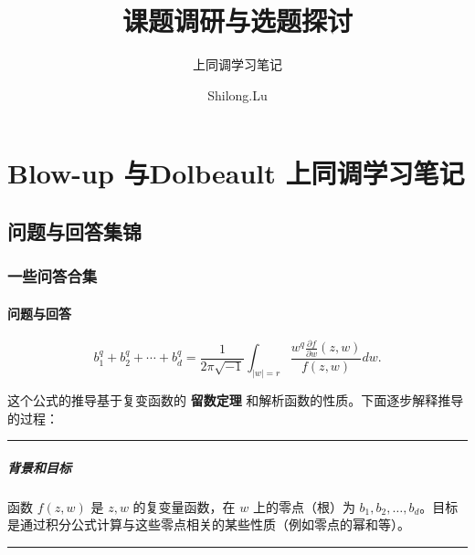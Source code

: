 \documentclass[lang=cn,zihao=-4,fontset=none,twoside]{fancybook}
\begin{document}
\thispagestyle{empty}
\title{课题调研与选题探讨}
\subtitle{上同调学习笔记}
\author{Shilong.Lu}
\makecover

\frontmatter
{}

\thispagestyle{empty}
\tableofcontents\let\cleardoublepage\clearpage

\mainmatter
{}
\partabstract{}
\part{Blow-up 与Dolbeault 上同调学习笔记}
\chapter{问题与回答集锦}
\section{一些问答合集}
\subsection{问题与回答}
\[
b_1^q + b_2^q + \cdots + b_d^q = \frac{1}{2\pi \sqrt{-1}} \int_{|w|=r} \frac{w^q \frac{\partial f}{\partial w}(z, w)}{f(z, w)} dw.
\]

这个公式的推导基于复变函数的 \textbf{留数定理}
和解析函数的性质。下面逐步解释推导的过程：

\begin{center}\rule{0.5\linewidth}{0.5pt}\end{center}

\hypertarget{ux80ccux666fux548cux76eeux6807}{%
\subsubsection{背景和目标}\label{ux80ccux666fux548cux76eeux6807}}

函数 \(f(z, w)\) 是 \(z, w\) 的复变量函数，在 \(w\) 上的零点（根）为
\(b_1, b_2, \dots, b_d\)。目标是通过积分公式计算与这些零点相关的某些性质（例如零点的幂和等）。

\begin{center}\rule{0.5\linewidth}{0.5pt}\end{center}
\end{document}
